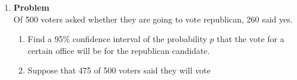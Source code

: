 \documentclass[12pt]{article}
\newenvironment{Ex}{\textbf{Problem}\vspace{.75em}\\}{}
\begin{document}
\begin{enumerate}
\begin{Ex}
\begin{solution}
\begin{enumerate}
\begin{mdframed}[backgroundcolor=silver]
\begin{description}
$$            (X-E[X])$$
            or alternatively
            $$\hat{\Theta} = E[\Theta]+
            \rho\frac{\sigma_{\Theta}}{\sigma_{X}}(X-E[X])$$
            where
            $$\rho =
            \frac{\text{Cov}(\Theta,X)}{\sigma_{\Theta}\sigma_{X}}$$
          \end{description}
        \end{mdframed}
        \begin{equation}
          \label{eq:3c-llms-estimator-sol}
          \begin{aligned}
            \hat{\Theta} &= E[\Theta]+
            \frac{\text{Cov}(\Theta,X)}{\text{Var}(X)} (X-E[X]) \\
            &= \frac{1}{2} + \frac{E[\Theta X] -
              E[\Theta]E[X]}{\frac{\theta^2}{12}}
            \left(X-\frac{\theta}{2}\right) \\
            &= \frac{1}{2} + \frac{E[\Theta X] -
              \frac{\theta}{4}}{\frac{\theta^2}{12}}
            \left(X-\frac{\theta}{2}\right) \\
            &= \frac{1}{2} + \frac{E[E[\Theta X|\Theta]] -
              \frac{\theta}{4}}{\frac{\theta^2}{12}}
            \left(X-\frac{\theta}{2}\right) \\
            &= \frac{1}{2} + \frac{E\left[\Theta
                \frac{1}{\theta}\right] -
              \frac{\theta}{4}}{\frac{\theta^2}{12}}
            \left(X-\frac{\theta}{2}\right) \\
            \implies \hat{\Theta} &= \frac{1}{2} + \frac{1 -
              \frac{\theta}{4}}{\frac{\theta^2}{12}}
            \left(X-\frac{\theta}{2}\right) \\
            \implies \hat{\Theta} &= \frac{2 \theta^2-3 \theta
              (X+2)+12 X}{\theta^2} \\
          \end{aligned}
        \end{equation}
      \end{enumerate}
    \end{solution}
  \end{Ex}
\item
  \begin{Ex}
    Of 500 voters asked whether they are going to vote republican, 260
    said yes.
    \begin{enumerate}
    \item Find a 95\% confidence interval of the probability $p$ that
      the vote for a certain office will be for the republican
      candidate.
    \item Suppose that 475 of 500 voters said they will vote

\end{enumerate}
\end{Ex}
\end{enumerate}
\end{document}
